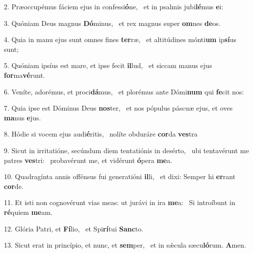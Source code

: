 2. Præoccupémus fáciem ejus in confessi\textbf{ó}ne, \ast\  et in psalmis jubi\textbf{lé}mus \textbf{e}i:\

3. Quóniam Deus magnus \textbf{Dó}minus, \ast\  et rex magnus super \textbf{om}nes \textbf{de}os.\

4. Quia in manu ejus sunt omnes fines \textbf{ter}ræ, \ast\  et altitúdines mónti\textbf{um} ip\textbf{sí}us sunt;\

5. Quóniam ipsíus est mare, et ipse fecit \textbf{il}lud, \ast\  et siccam manus ejus \textbf{for}ma\textbf{vé}runt.\

6. Veníte, adorémus, et proci\textbf{dá}mus, \ast\  et plorémus ante Dómi\textbf{num} qui \textbf{fe}cit nos:\

7. Quia ipse est Dóminus Deus \textbf{nos}ter, \ast\  et nos pópulus páscuæ ejus, et oves \textbf{ma}nus \textbf{e}jus.\

8. Hódie si vocem ejus audi\textbf{é}ritis, \ast\  nolíte obduráre \textbf{cor}da \textbf{ves}tra\

9. Sicut in irritatióne, secúndum diem tentatiónis in desérto, \dag\  ubi tentavérunt me patres \textbf{ves}tri: \ast\  probavérunt me, et vidérunt \textbf{ó}pera \textbf{me}a.\

10. Quadragínta annis offénsus fui generatióni \textbf{il}li, \ast\  et dixi: Semper hi \textbf{er}rant \textbf{cor}de.\

11. Et isti non cognovérunt vias meas: ut jurávi in ira \textbf{me}a: \ast\  Si introíbunt in \textbf{ré}quiem \textbf{me}am.\

12. Glória Patri, et \textbf{Fí}lio, \ast\  et Spi\textbf{rí}tui \textbf{Sanc}to.\

13. Sicut erat in princípio, et nunc, et \textbf{sem}per, \ast\  et in sǽcula sæcu\textbf{ló}rum. \textbf{A}men.\

